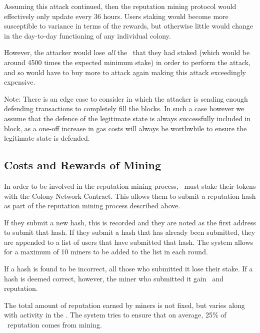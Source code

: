 Assuming this attack continued, then the reputation mining protocol would effectively only update every 36 hours. Users staking would become more susceptible to variance in terms of the rewards, but otherwise little would change in the day-to-day functioning of any individual colony. 

However, the attacker would lose \emph{all} the \rct\ that they had staked (which would be around 4500 times the expected minimum stake) in order to perform the attack, and so would have to buy more to attack again making this attack exceedingly expensive.


Note: There is an edge case to consider in which the attacker is sending enough defending transactions to completely fill the blocks. In such a case however we assume that the defence of the legitimate state is always successfully included in block, as a one-off increase in gas costs will always be worthwhile to ensure the legitimate state is defended.  

\subsection{Costs and Rewards of Mining}\label{subsec:mining-costs-and-rewards}
In order to be involved in the reputation mining process, \rcths\ must stake their tokens with the Colony Network Contract. This allows them to submit a reputation hash as part of the reputation mining process described above.

If they submit a new hash, this is recorded and they are noted as the first address to submit that hash. If they submit a hash that has already been submitted, they are appended to a list of users that have submitted that hash. The system allows for a maximum of 10 miners to be added to the list in each round.

If a hash is found to be incorrect, all those who submitted it lose their stake. If a hash is deemed correct, however, the miner who submitted it gain \rcts\ and reputation. 

The total amount of reputation earned by miners is not fixed, but varies along with activity in the \rc. The system tries to ensure that on average, 25\% of \rc\ reputation comes from mining. %

